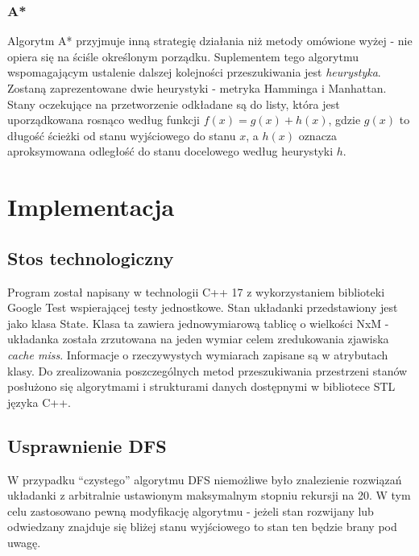 \documentclass{classrep}
\begin{document}
\subsubsection{A*}
Algorytm A* przyjmuje inną strategię działania niż metody
omówione wyżej - nie opiera się na ściśle określonym porządku. Suplementem tego
algorytmu wspomagającym ustalenie dalszej kolejności przeszukiwania jest \emph{heurystyka}.
Zostaną zaprezentowane dwie heurystyki - metryka Hamminga i Manhattan.
Stany oczekujące na przetworzenie odkładane są do listy, która jest uporządkowana
rosnąco według funkcji $ f(x) = g(x) + h(x) $, gdzie $ g(x) $ to długość ścieżki
od stanu wyjściowego do stanu $ x $, a $ h(x) $ oznacza aproksymowana odległość
do stanu docelowego według heurystyki $ h $.

\section{Implementacja}
\subsection{Stos technologiczny}

Program został napisany w technologii C++ 17 z wykorzystaniem biblioteki
Google Test wspierającej testy jednostkowe. Stan układanki przedstawiony
jest jako klasa State. Klasa ta zawiera jednowymiarową tablicę o
wielkości NxM - układanka została zrzutowana na jeden wymiar celem
zredukowania zjawiska \emph{cache miss}. Informacje o rzeczywystych
wymiarach zapisane są w atrybutach klasy. Do zrealizowania
poszczególnych metod przeszukiwania przestrzeni stanów posłużono się
algorytmami i strukturami danych dostępnymi w bibliotece STL języka C++.

\subsection{Usprawnienie DFS}

W przypadku ``czystego'' algorytmu DFS niemożliwe było znalezienie rozwiązań
układanki z arbitralnie ustawionym maksymalnym stopniu rekursji na 20. W tym celu zastosowano
pewną modyfikację algorytmu - jeżeli stan rozwijany lub odwiedzany znajduje się bliżej
stanu wyjściowego to stan ten będzie brany pod uwagę.
\end{document}
